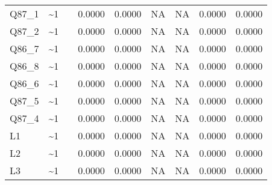 \begin{longtable}{lllrrrrrr}
Q87\_1 & \textasciitilde{}1 &  & 0.0000 & 0.0000 & NA & NA & 0.0000 & 0.0000\\
Q87\_2 & \textasciitilde{}1 &  & 0.0000 & 0.0000 & NA & NA & 0.0000 & 0.0000\\
Q86\_7 & \textasciitilde{}1 &  & 0.0000 & 0.0000 & NA & NA & 0.0000 & 0.0000\\
\addlinespace
Q86\_8 & \textasciitilde{}1 &  & 0.0000 & 0.0000 & NA & NA & 0.0000 & 0.0000\\
Q86\_6 & \textasciitilde{}1 &  & 0.0000 & 0.0000 & NA & NA & 0.0000 & 0.0000\\
Q87\_5 & \textasciitilde{}1 &  & 0.0000 & 0.0000 & NA & NA & 0.0000 & 0.0000\\
Q87\_4 & \textasciitilde{}1 &  & 0.0000 & 0.0000 & NA & NA & 0.0000 & 0.0000\\
L1 & \textasciitilde{}1 &  & 0.0000 & 0.0000 & NA & NA & 0.0000 & 0.0000\\
\addlinespace
L2 & \textasciitilde{}1 &  & 0.0000 & 0.0000 & NA & NA & 0.0000 & 0.0000\\
L3 & \textasciitilde{}1 &  & 0.0000 & 0.0000 & NA & NA & 0.0000 & 0.0000\\*
\end{longtable}
\endgroup{}
